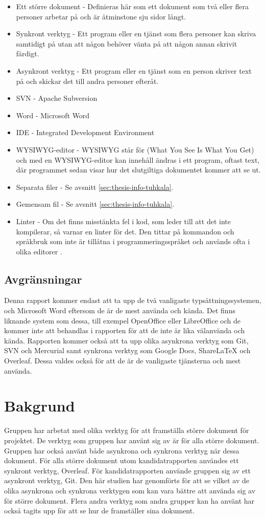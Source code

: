 \begin{itemize}
	\item Ett större dokument - Definieras här som ett dokument som två eller flera personer arbetar på och är åtminstone sju sidor långt.
	\item Synkront verktyg - Ett program eller en tjänst som flera personer kan skriva samtidigt på utan att någon behöver vänta på att någon annan skrivit färdigt.
	\item Asynkront verktyg - Ett program eller en tjänst som en person skriver text på och skickar det till andra personer efteråt.
	\item SVN - Apache Subversion
	\item Word - Microsoft Word
	\item IDE - Integrated Development Environment
	\item WYSIWYG-editor - WYSIWYG står för (What You See Is What You Get) och med en WYSIWYG-editor kan innehåll ändras i ett program, oftast text, där programmet sedan visar hur det slutgiltiga dokumentet kommer att se ut.
	\item Separata filer - Se avsnitt \ref{sec:thesis-info-tuhkala}.
	\item Gemensam fil - Se avsnitt \ref{sec:thesis-info-tuhkala}.
	\item Linter - Om det finns misstänkta fel i kod, som leder till att det inte kompilerar, så varnar en linter för det. Den tittar på kommandon och språkbruk som inte är tillåtna i programmeringsspråket och används ofta i olika editorer \cite{linter}.
\end{itemize}

\subsection{Avgränsningar}
Denna rapport kommer endast att ta upp de två vanligaste typsättningssystemen, \latex och Microsoft Word eftersom de är de mest använda och kända. Det finns liknande system som dessa, till exempel OpenOffice eller LibreOffice och de kommer inte att behandlas i rapporten för att de inte är lika välanvända och kända. Rapporten kommer också att ta upp olika asynkrona verktyg som Git, SVN och Mercurial samt synkrona verktyg som Google Docs, ShareLaTeX och Overleaf. Dessa valdes också för att de är de vanligaste tjänsterna och mest använda.

\section{Bakgrund}
\label{sec:background-tuhkala}
Gruppen har arbetat med olika verktyg för att framställa större dokument för projektet. De verktyg som gruppen har använt sig av är \latex för alla större dokument. Gruppen har också använt både asynkrona och synkrona verktyg när dessa dokument. För alla större dokument utom kandidatrapporten användes ett synkront verktyg, Overleaf. För kandidatrapporten använde gruppen sig av ett asynkront verktyg, Git. Den här studien har genomförts för att se vilket av de olika asynkrona och synkrona verktygen som kan vara bättre att använda sig av för större dokument. Flera andra verktyg som andra grupper kan ha använt har också tagits upp för att se hur de framställer sina dokument.

